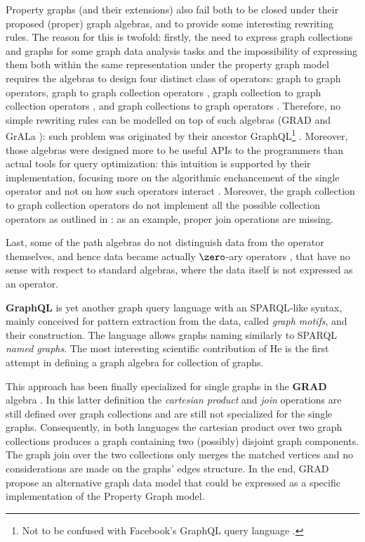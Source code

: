 Property graphs (and their extensions) also fail both to be closed under their proposed (proper) graph algebras, and to provide some interesting rewriting rules. The reason for this is twofold: firstly, the need to express graph collections and graphs for some graph data analysis tasks \cite{apacheflink} and the impossibility of expressing them both within the same representation under the property graph model requires the algebras to design four distinct class of operators: graph to graph operators, graph to graph collection operators \cite{JunghannsKAPR17}, graph collection to graph collection operators \cite{He2007}, and graph collections to graph operators \cite{apacheflink}. Therefore, no simple rewriting rules can be modelled on top of such algebras (GRAD \cite{GRAD,Ghrab2015} and GrALa \cite{apacheflink}): such problem was originated by  their ancestor GraphQL\footnote{Not to be confused with Facebook's GraphQL query language \cite{FGraphQL}.} \cite{He2007}. Moreover, those algebras were designed more to be useful APIs to the programmers than actual tools for query optimization: this intuition is supported by their implementation, focusing more on the algorithmic enchancement of the single operator and not on how such operators interact \cite{JunghannsPR17}. Moreover, the graph collection to graph collection operators do not implement all the possible collection operators as outlined in \cite{magnani04}: as an example, proper join operations are missing.

Last, some of the path algebras do not distinguish data from the operator themselves, and hence data became actually $\zero$-ary operators \cite{Neo4jAlg,MartonSV17,ThakkarPAV17}, that have no sense with respect to standard algebras, where the data itself is not expressed as an operator.

\textbf{GraphQL} \cite{He2007} is yet another graph query language with an SPARQL-like syntax, mainly conceived
for pattern extraction from the data, called \textit{graph motifs}, and their construction. The language
allows graphs naming similarly to SPARQL \textit{named graphs}. The most interesting scientific contribution
of He \cite{He2007} is the first attempt in defining a graph algebra for collection of graphs.

This approach has been finally specialized for single graphs in the \textbf{GRAD} algebra \cite{GRAD,Ghrab2015}. In this
latter definition the \textit{cartesian product} and \textit{join} operations are still defined over
graph collections and are still not specialized for the single graphs. Consequently, in both languages
the cartesian product over two graph collections produces a graph containing two (possibly) disjoint graph
components. The graph join over the two collections only merges the matched vertices and no considerations
are made on the graphs' edges structure. In the end, GRAD propose an alternative
graph data model that could be expressed as a specific implementation of the Property Graph model.

